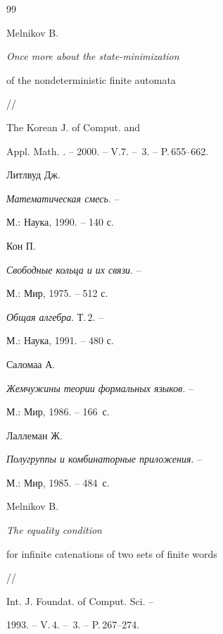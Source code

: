 \begin{thebibliography}{99}


 Melnikov B.


{\em Once more about the state-minimization


 of the nondeterministic finite automata} // 


 The Korean J. of Comput. and


 Appl. Math. . -- 2000. -- V.7. -- \No\,3. -- P.\,655--662.







 Литлвуд Дж.


{\em Математическая смесь}. --


 М.: Наука, 1990. -- 140 с.







 Кон П.


{\em Свободные кольца и их связи}. --


 М.: Мир, 1975. -- 512 с.







{\em Общая алгебра}. Т.\,2. --


 М.: Наука, 1991. -- 480 с.







 Саломаа А.


{\em Жемчужины теории формальных языков}. --


 М.: Мир, 1986. -- 166~с.







 Лаллеман Ж.


{\em Полугруппы и комбинаторные приложения}. --


 М.: Мир, 1985. -- 484~с.







 Melnikov B.


{\em The equality condition


 for infinite catenations of two sets of finite words} // 


 Int. J. Foundat. of Comput. Sci. --


 1993. -- V.\,4. -- \No\,3. -- P.\,267--274.






\end{thebibliography}
